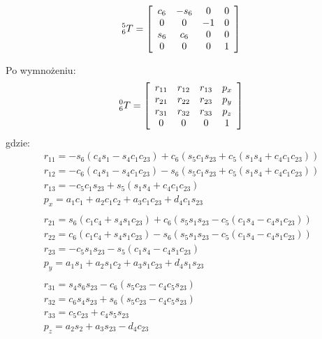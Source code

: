 \documentclass[]{article}
\begin{document}
\[\prescript{5}{6}{T}=\begin{bmatrix}
\begin{array}{cccc}
c_6 & -s_6 & 0 & 0 \\
0 & 0 & -1 & 0 \\
s_6 & c_6 & 0 & 0 \\
0 & 0 & 0 & 1 \\
\end{array}
\end{bmatrix}
\]

Po wymnożeniu:
\[\prescript{0}{6}{T}=\begin{bmatrix}
\begin{array}{cccc}
r_{11} & r_{12} & r_{13} & p_x \\
r_{21} & r_{22} & r_{23} & p_y \\
r_{31} & r_{32} & r_{33} & p_z \\
0 & 0 & 0 & 1 \\
\end{array}
\end{bmatrix}
\]
gdzie:
\begin{equation}\begin{array}{l}
r_{11} = - s_6(c_4s_1 - s_4c_1c_{23}) + c_6(s_5c_1s_{23} + c_5(s_1s_4 + c_4c_1c_{23})) \\
r_{12} = - c_6(c_4s_1 - s_4c_1c_{23}) - s_6(s_5c_1s_{23} + c_5(s_1s_4 + c_4c_1c_{23})) \\
r_{13} = - c_5c_1s_{23} + s_5(s_1s_4 + c_4c_1c_{23}) \\
p_x = a_1c_1 + a_2c_1c_2 + a_3c_1c_{23} + d_4c_1s_{23}
\\
\\
r_{21} = s_6(c_1c_4 + s_4s_1c_{23}) + c_6(s_5s_1s_{23} - c_5(c_1s_4 - c_4s_1c_{23})) \\
r_{22} = c_6(c_1c_4 + s_4s_1c_{23}) - s_6(s_5s_1s_{23} - c_5(c_1s_4 - c_4s_1c_{23})) \\
r_{23} = - c_5s_1s_{23} - s_5(c_1s_4 - c_4s_1c_{23}) \\
p_y = a_1s_1 + a_2s_1c_2 + a_3s_1c_{23} + d_4s_1s_{23}
\\
\\
r_{31} = s_4s_6s_{23} - c_6(s_5c_{23} - c_4c_5s_{23}) \\
r_{32} = c_6s_4s_{23} + s_6(s_5c_{23} - c_4c_5s_{23}) \\
r_{33} = c_5c_{23} + c_4s_5s_{23} \\
p_z = a_2s_2 + a_3s_{23} - d_4c_{23}
\\
\end{array}
\end{equation}
\end{document}
